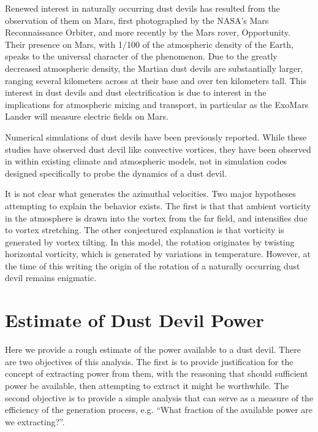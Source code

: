 Renewed interest in naturally occurring dust devils has resulted from
the observation of them on Mars, first photographed by the NASA's Mars
Reconnaissance Orbiter\cite{}, and more recently by the Mars rover,
Opportunity. Their presence on Mars, with 1/100 of the atmospheric
density of the Earth, speaks to the universal character of the
phenomenon. Due to the greatly decreased atmospheric density, the
Martian dust devils are substantially larger, ranging several kilometers
across at their base and over ten kilometers tall. This interest in dust
devils and dust electrification is due to interest in the implications for
atmospheric mixing and transport, in particular as the ExoMars Lander
will measure electric fields on Mars\cite{renno_comm}.

Numerical simulations of dust devils have been previously
reported. While these studies have observed dust
devil like convective vortices, they have been observed in within
existing climate and atmospheric
models\cite{QJ:QJ200513160722,doi:10.3137/ao.420105}, not in simulation 
codes designed specifically to probe the dynamics of a dust devil. 

It is not clear what generates the azimuthal velocities. Two major
hypotheses attempting to explain the behavior exists. The first is that
that ambient vorticity in the atmosphere is drawn into the vortex from
the far field, and intensifies due to vortex stretching\cite{}. %
The other conjectured explanation is that vorticity is generated by
vortex tilting. In this model, the rotation originates by twisting
horizontal vorticity, which is generated by variations in
temperature\cite{}. %
However, at the time of this writing the origin of
the rotation of a naturally occurring dust devil remains enigmatic. 

%
%


\section{Estimate of Dust Devil Power}
\label{sec:estimate_power}

Here we provide a rough estimate of the power
available to a dust devil. There are two objectives of this
analysis. The first is to provide justification for the concept of
extracting power from them, with the reasoning that should
sufficient power be available, then attempting to extract it might be
worthwhile. The second objective is to provide a simple analysis that
can serve as a measure of the efficiency of the generation process,
e.g. ``What fraction of the available power are we extracting?''.  

